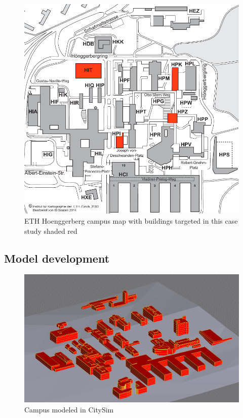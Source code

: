 \documentclass{tBPS2e}
\theoremstyle{plain}
\theoremstyle{definition}
\theoremstyle{remark}
\begin{document}
\begin{figure}
\centering
\includegraphics[scale=0.75]{figures/ETH_Hoenngerbergcamp_targetedbuildings}
\caption{ETH Hoenggerberg campus map with buildings targeted in this case study shaded red}
\label{fig:campusmap}
\end{figure}

\subsection{Model development}


\begin{figure}
\centering
\includegraphics[scale=0.3]{figures/campuscitysim}
\caption{Campus modeled in CitySim}
\label{fig:campuscitysim}
\end{figure}
\end{document}
